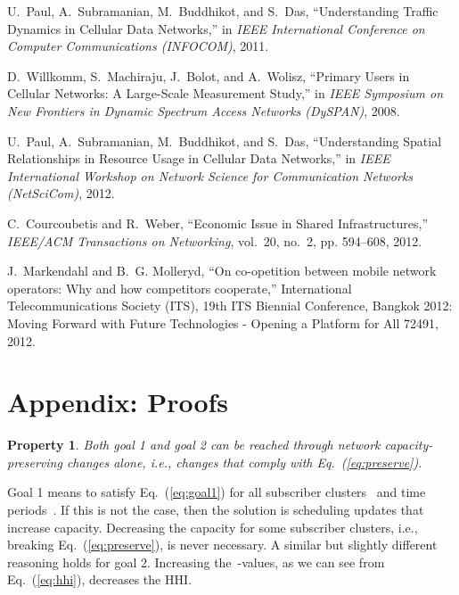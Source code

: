 \documentclass[10pt,journal,cspaper,compsoc]{IEEEtran}
\newcommand{\Eq}[1]{Eq.~(\ref{eq:#1})}
\newtheorem{property}{Property}
\begin{document}
\begin{thebibliography}{10}
U.~Paul, A.~Subramanian, M.~Buddhikot, and S.~Das, ``{Understanding Traffic
  Dynamics in Cellular Data Networks},'' in \emph{IEEE International Conference
  on Computer Communications (INFOCOM)}, 2011.

D.~Willkomm, S.~Machiraju, J.~Bolot, and A.~Wolisz, ``{Primary Users in
  Cellular Networks: A Large-Scale Measurement Study},'' in \emph{IEEE
  Symposium on New Frontiers in Dynamic Spectrum Access Networks (DySPAN)},
  2008.

U.~Paul, A.~Subramanian, M.~Buddhikot, and S.~Das, ``{Understanding Spatial
  Relationships in Resource Usage in Cellular Data Networks},'' in \emph{IEEE
  International Workshop on Network Science for Communication Networks
  (NetSciCom)}, 2012.

C.~Courcoubetis and R.~Weber, ``{Economic Issue in Shared Infrastructures},''
  \emph{IEEE/ACM Transactions on Networking}, vol.~20, no.~2, pp. 594--608,
  2012.

J.~Markendahl and B.~G. Molleryd, ``{On co-opetition between mobile network
  operators: Why and how competitors cooperate},'' International
  Telecommunications Society (ITS), 19th ITS Biennial Conference, Bangkok 2012:
  Moving Forward with Future Technologies - Opening a Platform for All 72491,
  2012.

\end{thebibliography}
 
\appendices

\clearpage\newpage

\setcounter{lemma}{0}
\setcounter{property}{0}
\section*{Appendix: Proofs}
\begin{property}
Both goal 1 and goal 2 can be reached through network capacity-preserving changes alone, i.e.,
changes that comply with \Eq{preserve}.
\end{property}
\begin{IEEEproof}
Goal 1 means to satisfy \Eq{goal1} for all subscriber clusters~ and time periods~.
If this is not the case, then the solution is scheduling updates that increase capacity.
Decreasing the capacity for some subscriber clusters, i.e., breaking \Eq{preserve}, is never necessary.
A similar but slightly different reasoning holds for goal 2. Increasing
the~-values, as we can see from \Eq{hhi}, decreases the HHI.
\end{IEEEproof}
\end{document}

